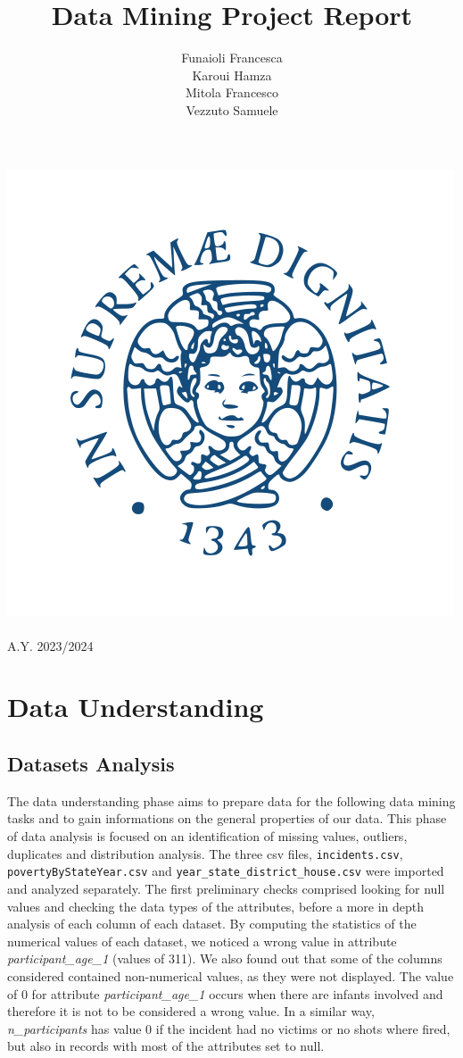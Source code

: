 \documentclass[10pt,a4paper]{report}
\title{\huge{\textbf{Data Mining Project Report}}}
\author{Funaioli Francesca\\
Karoui Hamza\\
Mitola Francesco\\
Vezzuto Samuele\\
}
\begin{document}
\makeatletter
\begin{titlepage}
	\begin{center}
		\includegraphics[width=0.4\linewidth]{unipi}\\[4ex]
		{\huge \bfseries  \@title }\\[2ex]
		{\Large A.Y. 2023/2024 }\\[6ex]
		{\large  \@author}
	\end{center}
\end{titlepage}
\makeatother

\tableofcontents

\chapter{Data Understanding}

\section{Datasets Analysis}

The data understanding phase aims to prepare data for the following data mining tasks and to gain informations on the general properties of our data.
This phase of data analysis is focused on an identification of missing values, outliers, duplicates and distribution analysis.
The three csv files, \texttt{incidents.csv}, \texttt{povertyByStateYear.csv} and \texttt{year\_state\_district\_house.csv} were imported and analyzed separately.
The first preliminary checks comprised looking for null values and checking the data types of the attributes, before a more in depth analysis of each column of each dataset.
By computing the statistics of the numerical values of each dataset, we noticed a wrong value in attribute \textit{participant\_age\_1} (values of 311).
We also found out that some of the columns considered contained non-numerical values, as they were not displayed.
The value of 0 for attribute \textit{participant\_age\_1} occurs when there are infants involved and therefore it is not to be considered a wrong value.
In a similar way, \textit{n\_participants} has value 0 if the incident had no victims or no shots where fired, but also in records with most of the attributes set to null.
\end{document}
